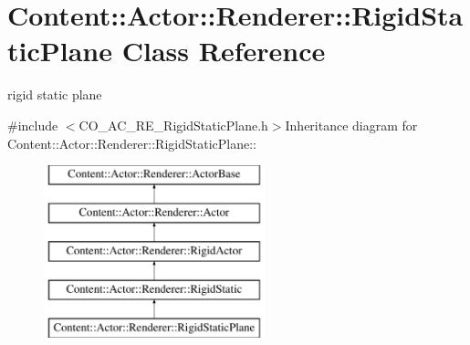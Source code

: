 \hypertarget{classContent_1_1Actor_1_1Renderer_1_1RigidStaticPlane}{
\section{Content::Actor::Renderer::RigidStaticPlane Class Reference}
\label{classContent_1_1Actor_1_1Renderer_1_1RigidStaticPlane}
}


rigid static plane  


{\ttfamily \#include $<$CO\_\-AC\_\-RE\_\-RigidStaticPlane.h$>$}Inheritance diagram for Content::Actor::Renderer::RigidStaticPlane::\begin{figure}[H]
\begin{center}
\leavevmode
\includegraphics[height=5cm]{classContent_1_1Actor_1_1Renderer_1_1RigidStaticPlane}
\end{center}
\end{figure}
